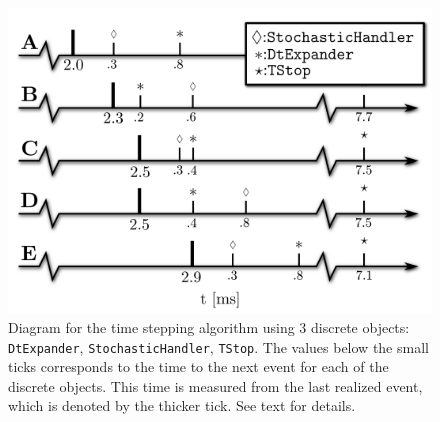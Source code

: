 \begin{figure}
  \label{fig:hake:time-line}
  \centering
  \includegraphics[width=0.6\linewidth]{chapters/hake/pdf/timeline}
  \caption[Time stepping algorithm]{Diagram for the time stepping
    algorithm using 3 discrete objects: \texttt{DtExpander},
    \texttt{StochasticHandler}, \texttt{TStop}. The values below the
    small ticks corresponds to the time to the next event for each of
    the discrete objects. This time is measured from the last realized
    event, which is denoted by the thicker tick. See text for details.}
\end{figure}

